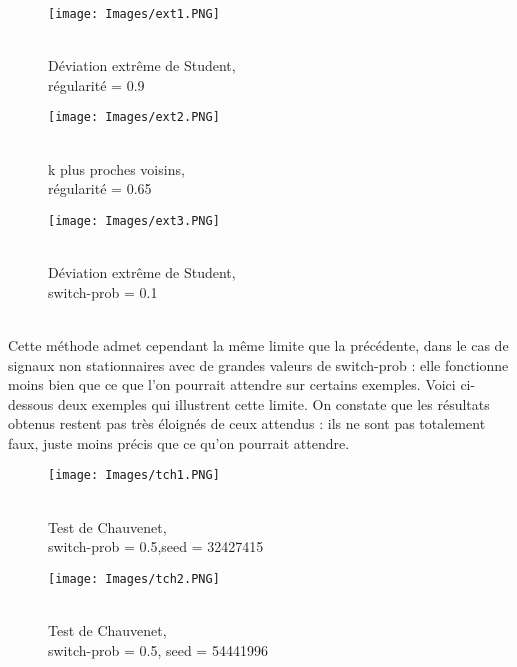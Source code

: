 \documentclass[a4paper,12pt]{article} %
\begin{document}
        \begin{figure}[H] %
        \texttt{[image: Images/ext1.PNG]} %
        \caption{\\Déviation extrême de Student,\\ régularité = 0.9} %
        \label{m15} %
        \endminipage
        \hfill
        \endminipage
        \texttt{[image: Images/ext2.PNG]}
        \caption{\\k plus proches voisins,\\ régularité = 0.65}
        \label{m5}
        \endminipage
        \hfill
        \endminipage
        \texttt{[image: Images/ext3.PNG]}  
        
        \caption{\\Déviation extrême de Student,\\ switch-prob = 0.1}
        
        \label{m35}
        \endminipage
        \end{figure}
        \\
        Cette méthode admet cependant la même limite que la précédente, dans le cas de signaux non stationnaires avec de grandes valeurs de switch-prob : elle fonctionne moins bien que ce que l'on pourrait attendre sur certains exemples. Voici ci-dessous deux exemples qui illustrent cette limite. On constate que les résultats obtenus restent pas très éloignés de ceux attendus : ils ne sont pas totalement faux, juste moins précis que ce qu'on pourrait attendre.
        \begin{figure}[H] %
        \texttt{[image: Images/tch1.PNG]} %
        \caption{\\Test de Chauvenet,\\switch-prob = 0.5,seed = 32427415} %
        \label{m15} %
        \endminipage
        \texttt{[image: Images/tch2.PNG]}  
        \caption{\\Test de Chauvenet,\\switch-prob = 0.5, seed = 54441996}
        \label{m5}
        \endminipage
        \end{figure}
        
\end{document}
